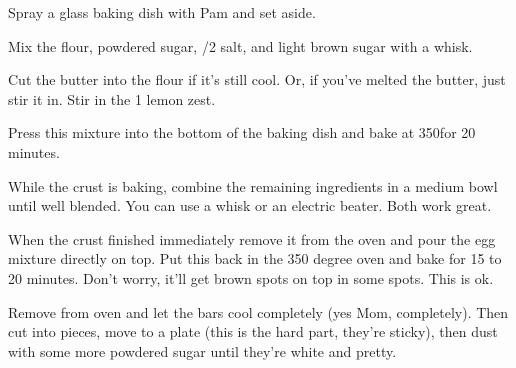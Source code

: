 \begin{IngredientsAndSteps}
    {
        Spray a  glass baking dish with Pam and set aside.

        Mix the flour, powdered sugar, /2 \tsp salt, and light brown sugar
        with a whisk.

        Cut the butter into the flour if it's still cool. Or, if you've melted
        the butter, just stir it in. Stir in the 1 \Tbl lemon zest.

        Press this mixture into the bottom of the baking dish and bake at 350\Degrees[F] for 20 minutes.
    }

    {
        While the crust is baking, combine the remaining ingredients in a medium bowl until
        well blended. You can use a whisk or an electric beater. Both work great.
    }

    \ListIngredientsAndSteps[Assembly]
    {
    }
    {
        When the crust finished immediately remove it from the oven and pour the egg mixture
        directly on top. Put this back in the 350 degree oven and bake for 15 to 20 minutes. Don't
        worry, it'll get brown spots on top in some spots. This is ok.

        Remove from oven and let the bars cool completely (yes Mom, completely). Then cut into
         pieces, move to a plate (this is the hard part, they're sticky), then dust
        with some more powdered sugar until they're white and pretty.
    }
\end{IngredientsAndSteps}

%
%
%
%
\newpage



